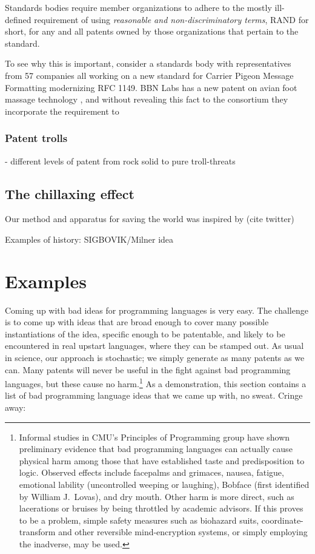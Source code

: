 \documentclass[acmtocl]%
{boviktrans}
\begin{document}
Standards bodies require member organizations to adhere to the mostly
ill-defined requirement of using {\it reasonable and
  non-discriminatory terms}, RAND for short, for any and all patents
owned by those organizations that pertain to the standard.

To see why this is important, consider a standards body with
representatives from 57 companies all working on a new standard for
Carrier Pigeon Message Formatting modernizing RFC 1149. BBN Labs has
a new patent on avian foot massage technology \cite{ebert}, and without
revealing this fact to the consortium they incorporate the requirement
to 

\subsubsection{Patent trolls}

- different levels of patent from rock solid to pure troll-threats

\subsection{The chillaxing effect}

Our method and apparatus for saving the world was inspired by
(cite twitter)

Examples of history: SIGBOVIK/Milner idea


\section{Examples}


Coming up with bad ideas for programming languages is very easy. The
challenge is to come up with ideas that are broad enough to cover many
possible instantiations of the idea, specific enough to be patentable,
and likely to be encountered in real upstart languages, where they can
be stamped out. As usual in science, our approach is stochastic; we
simply generate as many patents as we can. Many patents will never be
useful in the fight against bad programming languages, but these cause
no harm.\!\footnote{Informal studies in CMU's Principles of
  Programming group have shown preliminary evidence that bad
  programming languages can actually cause physical harm among those
  that have established taste and predisposition to logic. Observed
  effects include facepalms and grimaces, nausea, fatigue, emotional
  lability (uncontrolled weeping or laughing), Bobface (first identified
  by William J.~Lovas), and dry mouth. Other harm is more direct, such
  as lacerations or bruises by being throttled by academic advisors.
  If this proves to be a problem, simple safety measures such as biohazard
  suits, coordinate-transform and other reversible mind-encryption systems,
  or simply employing the inadverse, may be used.}
As a demonstration, this section contains a list of bad programming language
ideas that we came up with, no sweat. Cringe away:
\end{document}
